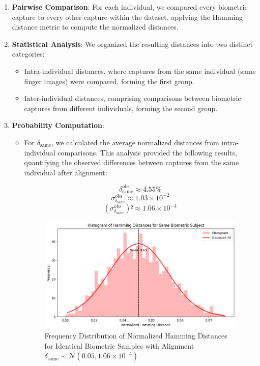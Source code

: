 \begin{enumerate}
    \item \textbf{Pairwise Comparison}: For each individual, we compared every biometric capture to every other capture within the dataset, applying the Hamming distance metric to compute the normalized distances.
    \newpage
    \item \textbf{Statistical Analysis}: We organized the resulting distances into two distinct categories:
    \begin{itemize}
        \item Intra-individual distances, where captures from the same individual (same finger images) were compared, forming the first group.
        \item Inter-individual distances, comprising comparisons between biometric captures from different individuals, forming the second group.
    \end{itemize}
    \item \textbf{Probability Computation}:
    \begin{itemize}
        \item For \( \delta_{\text{same}} \), we calculated the average normalized distances from intra-individual comparisons. This analysis provided the following results, quantifying the observed differences between captures from the same individual after alignment:

        \[ \delta_{\text{same}}^{\text{obs}} \approx 4.55\% \]
        \[ \sigma^{\text{obs}}_{\delta_{\text{same}}} \approx 1.03 \times 10^{-2} \]
        \[ (\sigma^{\text{obs}}_{\delta_{\text{same}}})² \approx 1.06 \times 10^{-4} \]

        \begin{figure}[H]
            \centering
            \includegraphics[width=0.7\linewidth]{latex-img/delta_same.png}
            \caption{Frequency Distribution of Normalized Hamming Distances for Identical Biometric Samples with Alignment \(\delta_{\text{same}} \sim \mathcal{N}(0.05, 1.06 \times 10^{-4})\)}
            \label{delta_same}
        \end{figure}
        

\end{itemize}
\end{enumerate}
